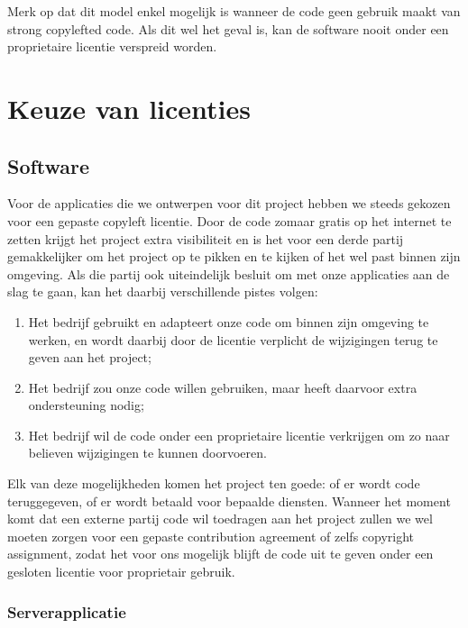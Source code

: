 Merk op dat dit model enkel mogelijk is wanneer de code geen gebruik maakt van strong copylefted code. Als dit wel het geval is, kan de software nooit onder een proprietaire licentie verspreid worden.

\section{Keuze van licenties}
\label{ontwerp:licenties:keuze}

\subsection{Software}
\label{ontwerp:licenties:keuze:software}

Voor de applicaties die we ontwerpen voor dit project hebben we steeds gekozen voor een gepaste copyleft licentie. Door de code zomaar gratis op het internet te zetten krijgt het project extra visibiliteit en is het voor een derde partij gemakkelijker om het project op te pikken en te kijken of het wel past binnen zijn omgeving. Als die partij ook uiteindelijk besluit om met onze applicaties aan de slag te gaan, kan het daarbij verschillende pistes volgen:
\begin{enumerate}
  \item Het bedrijf gebruikt en adapteert onze code om binnen zijn omgeving te werken, en wordt daarbij door de licentie verplicht de wijzigingen terug te geven aan het project;
  \item Het bedrijf zou onze code willen gebruiken, maar heeft daarvoor extra ondersteuning nodig;
  \item Het bedrijf wil de code onder een proprietaire licentie verkrijgen om zo naar believen wijzigingen te kunnen doorvoeren.
\end{enumerate}
Elk van deze mogelijkheden komen het project ten goede: of er wordt code teruggegeven, of er wordt betaald voor bepaalde diensten. Wanneer het moment komt dat een externe partij code wil toedragen aan het project zullen we wel moeten zorgen voor een gepaste contribution agreement of zelfs copyright assignment, zodat het voor ons mogelijk blijft de code uit te geven onder een gesloten licentie voor proprietair gebruik.

\subsubsection{Serverapplicatie}
\label{ontwerp:licenties:keuze:software:server}


